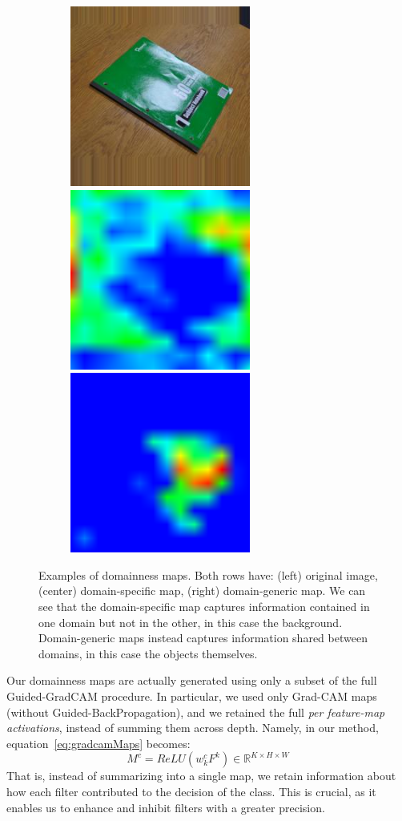 \documentclass[../main.tex]{subfiles}
\begin{document}
\begin{figure}[h!]
        \begin{subfigure}{\linewidth}
        	\includegraphics[width=.3\linewidth]{img/d1.png}\label{fig:dslr-1}\hfill
        	\includegraphics[width=.3\linewidth]{img/d-ad-d-1.png}\label{fig:dslr-dslr-1}\hfill
            \includegraphics[width=.3\linewidth]{img/d-ad-a-1.png}\label{fig:dslr-amazon-1}
        \end{subfigure}

        \caption{Examples of domainness maps. Both rows have: (left) original image, (center) domain-specific map,
            (right) domain-generic map. We can see that the domain-specific map captures information contained in one domain
            but not in the other, in this case the background. Domain-generic maps instead captures information shared between
            domains, in this case the objects themselves.}\label{fig:domain-shift-office}
	\end{figure}

    Our domainness maps are actually generated using only a subset of the full Guided-GradCAM procedure.
    In particular, we used only Grad-CAM maps (without Guided-BackPropagation), and we retained the full
    \textit{per feature-map activations}, instead of summing them across depth.
    Namely, in our method, equation~\ref{eq:gradcamMaps} becomes:
    \begin{equation}\label{eq:gradcamDomain}
        M^{c} = ReLU \left( w_{k}^{c} F^{k} \right) \in \mathbb{R}^{K \times H \times W}
    \end{equation}
    That is, instead of summarizing into a single map, we retain information about how each filter contributed to the decision
    of the class. This is crucial, as it enables us to enhance and inhibit filters with a greater precision.
    
\end{document}
